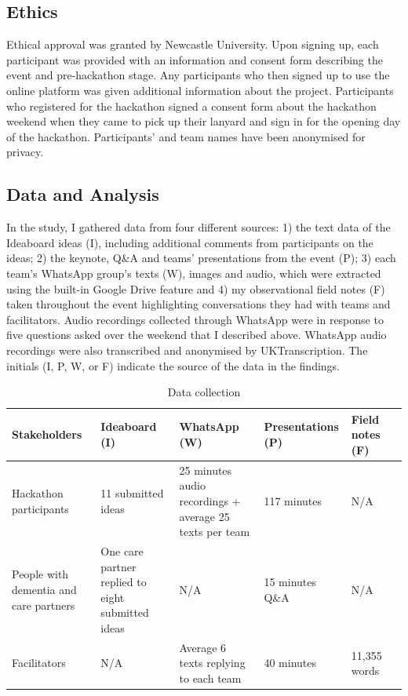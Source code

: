 \subsection{Ethics}
\label{sec:Ethics}
Ethical approval was granted by Newcastle University. Upon signing up, each participant was provided with an information and consent form describing the event and pre-hackathon stage. Any participants who then signed up to use the online platform was given additional information about the project. Participants who registered for the hackathon signed a consent form about the hackathon weekend when they came to pick up their lanyard and sign in for the opening day of the hackathon. Participants’ and team names have been anonymised for privacy.

\subsection{Data and Analysis}
\label{sec:DataAnalysis}
In the study, I gathered data from four different sources: 1) the text data of the Ideaboard ideas (I), including additional comments from participants on the ideas; 2) the keynote, Q\&A and teams’ presentations from the event (P); 3) each team’s WhatsApp group’s texts (W), images and audio, which were extracted using the built-in Google Drive feature and 4) my observational field notes (F) taken throughout the event highlighting conversations they had with teams and facilitators. Audio recordings collected through WhatsApp were in response to five questions asked over the weekend that I described above. WhatsApp audio recordings were also transcribed and anonymised by UKTranscription. The initials (I, P, W, or F) indicate the source of the data in the findings.

\begin{table}[ht]
\caption{}
\label{table:data collection}
\begin{tabularx}{\textwidth}{@{} Y|YYYYY @{}}
\textbf{Stakeholders} & \textbf{Ideaboard (I)} & \textbf{WhatsApp (W)} & \textbf{Presentations (P)} & \textbf{Field notes (F)} \\ \hline
Hackathon participants & 11 submitted ideas & 25 minutes audio recordings + average 25 texts per team & 117 minutes & N/A \\
People with dementia and care partners & One care partner replied to eight submitted ideas & N/A & 15 minutes Q\&A & N/A \\
Facilitators & N/A & Average 6 texts replying to each team & 40 minutes & 11,355 words \\
\end{tabularx}
\caption{Data collection}
\end{table}


